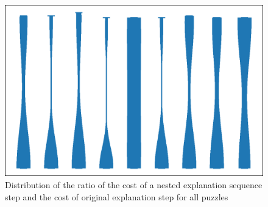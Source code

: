 \begin{figure}[t]
	\centering
	\includegraphics[width=.7\textwidth]{figures/violin_plot.eps}
	\caption{Distribution of the ratio of the cost of a nested explanation sequence step and the cost of original explanation step for all puzzles}
	\label{fig:experiments:violin}
\end{figure}


